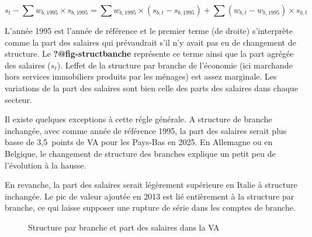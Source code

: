 \documentclass[
  french,
  9pt,
  a4paper,
]{article}
\begin{document}
\[
s_t - \sum w_{b,1995} \times s_{b,1995} =  \sum w_{b,1995} \times (s_{b,t}-s_{b,1995}) + \sum (w_{b,t} - w_{b,1995}) \times s_{b,t}  
\]

L'année 1995 est l'année de référence et le premier terme (de droite)
s'interprète comme la part des salaires qui prévaudrait s'il n'y avait
pas eu de changement de structure. Le \textbf{?@fig-structbanche}
représente ce terme ainsi que la part agrégée des salaires (\(s_{t}\)).
Leffet de la structure par branche de l'économie (ici marchande hors
services immobiliers produits par les ménages) est assez marginale. Les
variations de la part des salaires sont bien celle des parts des
salaires dans chaque secteur.

Il existe quelques exceptions à cette régle générale. A structure de
branche inchangée, avec comme année de référence 1995, la part des
salaires serait plus basse de 3,5~points de VA pour les Pays-Bas en
2025. En Allemagne ou en Belgique, le changement de structure des
branches explique un petit peu de l'évolution à la hausse.

En revanche, la part des salaires serait légèrement supérieure en Italie
à structure inchangée. Le pic de valeur ajoutée en 2013 est lié
entièrement à la structure par branche, ce qui laisse supposer une
rupture de série dans les comptes de branche.

\begin{figure}[H]

\caption{\label{fig-structbranche}Structure par branche et part des
salaires dans la VA}


\end{figure}%
\end{document}
